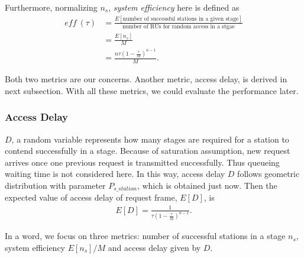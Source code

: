\documentclass[journal]{IEEEtran}
\begin{document}
Furthermore, normalizing $n_s$, \textit{system efficiency} here is defined as 
\begin{align}
\label{eff_def}
\textit{eff}\ (\tau) &= \frac{E[\text{number of successful stations in a given stage}]}{\text{number of RUs for random access in a stgae}} \nonumber\\
					 &=\frac{E[n_s]}{M} \nonumber \\
					 &= \frac{n\tau(1-\frac{\tau}{M})^{n-1}}{M}.
\end{align}

Both two metrics are our concerns. Another metric, access delay, is derived in next subsection.
With all these metrics, we could evaluate the performance later.

	
\subsubsection{Access Delay}
$D$, a random variable represents how many stages are required for a station to contend successfully in a stage. 
Because of saturation assumption, new request arrives once one previous request is transmitted successfully.
Thus queueing waiting time is not considered here. 
In this way, access delay $D$ follows geometric distribution with parameter $P_{s\_station}$, which is obtained just now.  
Then the expected value of access delay of request frame, $E[D]$, is 
\begin{align}
\label{equ_delay}
E[D] = \frac{1}{\tau (1-\frac{\tau}{M})^{n-1}}.
\end{align}


In a word, we focus on three metrics: number of successful stations in a stage $n_s$, system efficiency $E[n_s]/M$ and access delay given by $D$. 
\end{document}

